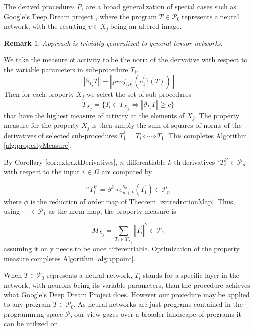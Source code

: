 \documentclass[smallcondensed]{svjour3}
\newcommand{\dP}{\mathcal{P}}
\newcommand{\D}{\partial}
\newtheorem{opomba}{Remark}[section]
\begin{document}
   The derived procedures $P$, are a broad generalization of special cases such as Google's Deep Dream project \cite{DeepDream}, where the program $T\in\dP_0$ represents a neural network, with the resulting $v\in X_j$ being an altered image.
   
   \begin{opomba}
      Approach is trivially generalized to general tensor networks.
      \end{opomba}
   
   We take the measure of activity to be the norm of the derivative with respect to the variable parameters in sub-procedure $T_i$.
   $$\left\Vert\D_{T_i}T\right\Vert=\left\Vert proj_{\{\D\}}\left(e^{\D_{T_i}}_1(T)\right)\right\Vert$$
   Then for each property $X_j$ we select the set of sub-procedures 
   $$T_{X_j}=\{T_i\in T_{X_j}\iff \left\Vert\D_{T_i}T\right\Vert\ge c\}$$
   that have the highest measure of activity at the elements of $X_j$. The property measure for the property $X_j$ is then simply the sum of squares of norms of the derivatives of selected sub-procedures $T^i_1=T_i\circ\cdots\circ T_1$. This completes Algorithm \ref{alg:propertyMeasure}. 
   
   By Corollary \ref{cor:extraxtDerivatives}, $n$-differentiable $k$-th derivatives $^{n}T^{k\prime}_i\in\dP_n$ with respect to the input $v\in\Omega$ are computed by
   
   \begin{equation}
   ^{n}T^{k\prime}_i=\phi^k\circ e^{\D_v}_{n+k}(T^i_1)\in\dP_n
   \end{equation}
   where $\phi$ is the reduction of order map of Theorem \ref{izr:reductionMap}.
   Thus, using $\left\Vert\cdot\right\Vert\in\dP_1$ as the norm map, the property measure is
   
   \begin{equation}
   M_{X_j}=\sum\limits_{T_i\in T_{X_j}} \left\Vert T^\prime_i\right\Vert^2\in\dP_1
   \end{equation}
   assuming it only needs to be once differentiable. Optimization of the property measure completes Algorithm \ref{alg:appoint}.
   
   When $T\in\dP_0$ represents a neural network, $T_i$ stands for a specific layer in the network, with neurons being its variable parameters, than the procedure achieves what Google's Deep Dream Project \cite{DeepDream} does. However our procedure may be applied to any program $T\in\dP_0$. As neural networks are just programs contained in the programming space $\dP$, our view gazes over a broader landscape of programs it can be utilized on.
   
\end{document}
